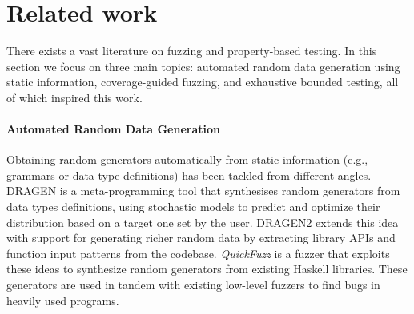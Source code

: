 \documentclass[sigconf,review,anonymous]{acmart}
\begin{document}



\section{Related work}
\label{sec:related}

There exists a vast literature on fuzzing and property-based testing.
%
In this section we focus on three main topics:
%
automated random data generation using static information,
%
coverage-guided fuzzing, and
%
exhaustive bounded testing, all of which inspired this work.


\paragraph{Automated Random Data Generation}

Obtaining random generators automatically from static information (e.g.,
grammars or data type definitions) has been tackled from different angles.
%
DRAGEN \cite{DBLP:conf/haskell/MistaRH18} is a meta-programming tool that
synthesises random generators from data types definitions, using stochastic
models to predict and optimize their distribution based on a target one set by
the user.
%
DRAGEN2 \cite{Mista2019GeneratingRS} extends this idea with support for
generating richer random data by extracting library APIs and function input
patterns from the codebase.
%
%
%
%
\emph{QuickFuzz} \cite{GriecoCB16, grieco2017} is a fuzzer that exploits these
ideas to synthesize random generators from existing Haskell libraries. These
generators are used in tandem with existing low-level fuzzers to find bugs in
heavily used programs.
\end{document}
